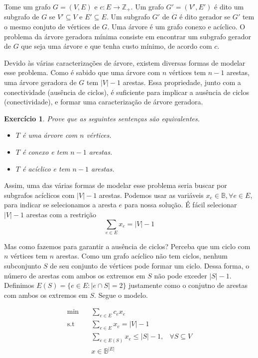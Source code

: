 \documentclass[]{article}
\newtheorem{exercicio}{Exercício}
\numberwithin{equation}{section}
\begin{document}
Tome um grafo $G = (V, E)$ e $c : E \to \mathbb{Z}_+$.
Um grafo $G' = (V', E')$ é dito um subgrafo de $G$ se $V' \subseteq V$ e $E' \subseteq E$.
Um subgrafo $G'$ de $G$ é dito gerador se $G'$ tem o mesmo conjuto de vértices de $G$.
Uma árvore é um grafo conexo e acíclico.
O problema da árvore geradora mínima consiste em encontrar um subgrafo gerador de $G$ que seja uma
árvore e que tenha custo mínimo, de acordo com $c$.

Devido às várias caracterizações de árvore, existem diversas formas de modelar esse problema.
Como é sabido que uma árvore com $n$ vértices tem $n - 1$ arestas, uma árvore geradora de $G$ tem
$|V| - 1$ arestas. Essa propriedade, junto com a conectividade (ausência de ciclos), é suficiente
para implicar a ausência de ciclos (conectividade), e formar uma caracterização de árvore geradora.

\begin{exercicio}
  Prove que as seguintes sentenças são equivalentes.
  \begin{itemize}
    \item $T$ é uma árvore com $n$ vértices.
    \item $T$ é conexo e tem $n - 1$ arestas.
    \item $T$ é acíclico e tem $n - 1$ arestas.
  \end{itemize}
\end{exercicio}

Assim, uma das várias formas de modelar esse problema seria buscar por subgrafos acíclicos com
$|V| - 1$ arestas. Podemos usar as variáveis $x_e \in \mathbb{B}, \forall e \in E$, para indicar se selecionamos a aresta $e$ para nossa solução. É fácil selecionar $|V| - 1$ arestas com a restrição
$$
\sum_{e \in E} x_e = |V| - 1
$$

Mas como fazemos para garantir a ausência de ciclos? Perceba que um ciclo com $n$ vértices tem $n$
arestas.
Como um grafo acíclico não tem ciclos, nenhum subconjunto $S$ de seu conjunto de vértices pode formar
um ciclo.
Dessa forma, o número de arestas com ambos os extremos em $S$ não pode exceder $|S| - 1$.
Definimos $E(S) = \{e \in E : |e \cap S| = 2\}$ justamente como o conjutno de arestas com ambos os
extremos em $S$.
Segue o modelo.

\begin{align}
\min        &\quad  \sum_{e \in E} c_ex_e \\
\text{s.t}  &\quad  \sum_{e \in E} x_e = |V| - 1 \\
            &\quad  \sum_{e \in E(S)} x_e \leq |S| - 1, & \forall S \subseteq V \\
            &\quad  x \in \mathbb{B}^{|E|}
\end{align}
\end{document}
